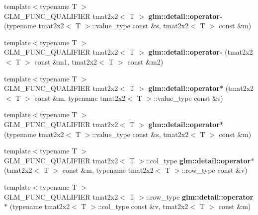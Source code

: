 \begin{DoxyCompactItemize}
\item 
\hypertarget{namespaceglm_1_1detail_ac06f804905b461239bba40d9c5cc0999}{}{\footnotesize template$<$typename T $>$ }\\G\+L\+M\+\_\+\+F\+U\+N\+C\+\_\+\+Q\+U\+A\+L\+I\+F\+I\+E\+R tmat2x2$<$ T $>$ {\bfseries glm\+::detail\+::operator-\/} (typename tmat2x2$<$ T $>$\+::value\+\_\+type const \&s, tmat2x2$<$ T $>$ const \&m)\label{namespaceglm_1_1detail_ac06f804905b461239bba40d9c5cc0999}

\item 
\hypertarget{namespaceglm_1_1detail_a31554eb2b8009270f740f822146ff67d}{}{\footnotesize template$<$typename T $>$ }\\G\+L\+M\+\_\+\+F\+U\+N\+C\+\_\+\+Q\+U\+A\+L\+I\+F\+I\+E\+R tmat2x2$<$ T $>$ {\bfseries glm\+::detail\+::operator-\/} (tmat2x2$<$ T $>$ const \&m1, tmat2x2$<$ T $>$ const \&m2)\label{namespaceglm_1_1detail_a31554eb2b8009270f740f822146ff67d}

\item 
\hypertarget{namespaceglm_1_1detail_a5f98eea98f44a7d0203cd29afc6e42e5}{}{\footnotesize template$<$typename T $>$ }\\G\+L\+M\+\_\+\+F\+U\+N\+C\+\_\+\+Q\+U\+A\+L\+I\+F\+I\+E\+R tmat2x2$<$ T $>$ {\bfseries glm\+::detail\+::operator$\ast$} (tmat2x2$<$ T $>$ const \&m, typename tmat2x2$<$ T $>$\+::value\+\_\+type const \&s)\label{namespaceglm_1_1detail_a5f98eea98f44a7d0203cd29afc6e42e5}

\item 
\hypertarget{namespaceglm_1_1detail_ac678332a184bf31b53cf2db22a908dd6}{}{\footnotesize template$<$typename T $>$ }\\G\+L\+M\+\_\+\+F\+U\+N\+C\+\_\+\+Q\+U\+A\+L\+I\+F\+I\+E\+R tmat2x2$<$ T $>$ {\bfseries glm\+::detail\+::operator$\ast$} (typename tmat2x2$<$ T $>$\+::value\+\_\+type const \&s, tmat2x2$<$ T $>$ const \&m)\label{namespaceglm_1_1detail_ac678332a184bf31b53cf2db22a908dd6}

\item 
\hypertarget{namespaceglm_1_1detail_a2ee193cd9fee0ec7617404509b09fc92}{}{\footnotesize template$<$typename T $>$ }\\G\+L\+M\+\_\+\+F\+U\+N\+C\+\_\+\+Q\+U\+A\+L\+I\+F\+I\+E\+R tmat2x2$<$ T $>$\+::col\+\_\+type {\bfseries glm\+::detail\+::operator$\ast$} (tmat2x2$<$ T $>$ const \&m, typename tmat2x2$<$ T $>$\+::row\+\_\+type const \&v)\label{namespaceglm_1_1detail_a2ee193cd9fee0ec7617404509b09fc92}

\item 
\hypertarget{namespaceglm_1_1detail_a35bcd115f72ddbbf54db829dbca452d9}{}{\footnotesize template$<$typename T $>$ }\\G\+L\+M\+\_\+\+F\+U\+N\+C\+\_\+\+Q\+U\+A\+L\+I\+F\+I\+E\+R tmat2x2$<$ T $>$\+::row\+\_\+type {\bfseries glm\+::detail\+::operator$\ast$} (typename tmat2x2$<$ T $>$\+::col\+\_\+type const \&v, tmat2x2$<$ T $>$ const \&m)\label{namespaceglm_1_1detail_a35bcd115f72ddbbf54db829dbca452d9}


\end{DoxyCompactItemize}
